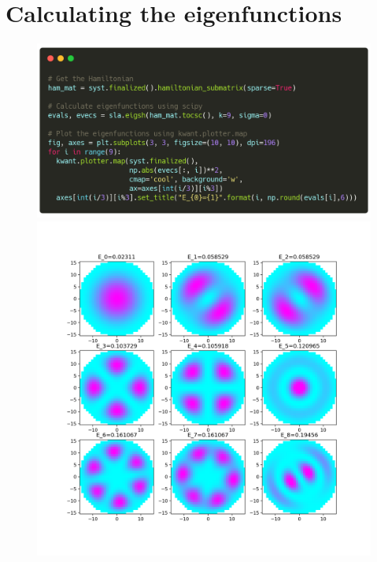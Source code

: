 \documentclass[12pt]{article}
\numberwithin{equation}{section}
\begin{document}
\section*{Calculating the eigenfunctions}
\begin{figure}[h!]
  \centering
  \begin{minipage}{0.49\textwidth}
    \centering
    \includegraphics[width=1.0\textwidth]{./media/example-eigenfunc-code.png} %
\end{minipage}\hfill
  \begin{minipage}{0.49\textwidth}
      \centering
      \includegraphics[width=1.0\textwidth]{./media/example-eigenfunc.png} %
  \end{minipage}
\end{figure}
\end{document}
